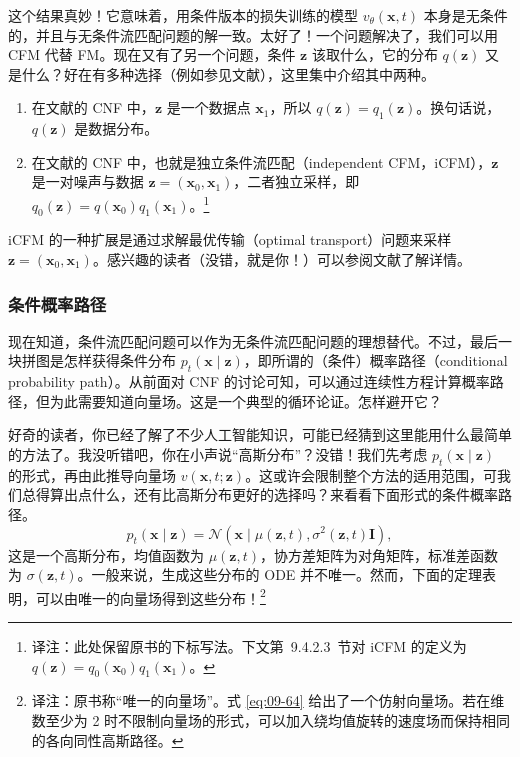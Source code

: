 这个结果真妙！它意味着，用条件版本的损失训练的模型 $v_\theta(\mathbf x,t)$ 本身是无条件的，并且与无条件流匹配问题的解一致。太好了！一个问题解决了，我们可以用 CFM 代替 FM。现在又有了另一个问题，条件 $\mathbf z$ 该取什么，它的分布 $q(\mathbf z)$ 又是什么？好在有多种选择（例如参见文献），这里集中介绍其中两种。
\begin{enumerate}
  \item 在文献的 CNF 中，$\mathbf z$ 是一个数据点 $\mathbf x_1$，所以 $q(\mathbf z)=q_1(\mathbf z)$。换句话说，$q(\mathbf z)$ 是数据分布。
  \item 在文献的 CNF 中，也就是独立条件流匹配（independent CFM，iCFM），$\mathbf z$ 是一对噪声与数据 $\mathbf z=(\mathbf x_0,\mathbf x_1)$，二者独立采样，即 $q_0(\mathbf z)=q(\mathbf x_0)q_1(\mathbf x_1)$。\footnote{译注：此处保留原书的下标写法。下文第~9.4.2.3~节对 iCFM 的定义为 $q(\mathbf z)=q_0(\mathbf x_0)q_1(\mathbf x_1)$。}
\end{enumerate}
iCFM 的一种扩展是通过求解最优传输（optimal transport）问题来采样 $\mathbf z=(\mathbf x_0,\mathbf x_1)$。感兴趣的读者（没错，就是你！）可以参阅文献了解详情。

\subsubsection{条件概率路径}

现在知道，条件流匹配问题可以作为无条件流匹配问题的理想替代。不过，最后一块拼图是怎样获得条件分布 $p_t(\mathbf x\mid\mathbf z)$，即所谓的（条件）概率路径（conditional probability path）。从前面对 CNF 的讨论可知，可以通过连续性方程计算概率路径，但为此需要知道向量场。这是一个典型的循环论证。怎样避开它？

好奇的读者，你已经了解了不少人工智能知识，可能已经猜到这里能用什么最简单的方法了。我没听错吧，你在小声说“高斯分布”？没错！我们先考虑 $p_t(\mathbf x\mid\mathbf z)$ 的形式，再由此推导向量场 $v(\mathbf x,t;\mathbf z)$。这或许会限制整个方法的适用范围，可我们总得算出点什么，还有比高斯分布更好的选择吗？来看看下面形式的条件概率路径。
\begin{equation}
  p_t(\mathbf x\mid\mathbf z)=
  \mathcal N(\mathbf x\mid\mu(\mathbf z,t),\sigma^2(\mathbf z,t)\mathbf I),
  \tag{9.63}\label{eq:09-63}
\end{equation}
这是一个高斯分布，均值函数为 $\mu(\mathbf z,t)$，协方差矩阵为对角矩阵，标准差函数为 $\sigma(\mathbf z,t)$。一般来说，生成这些分布的 ODE 并不唯一。然而，下面的定理表明，可以由唯一的向量场得到这些分布！\footnote{译注：原书称“唯一的向量场”。式 \eqref{eq:09-64} 给出了一个仿射向量场。若在维数至少为 2 时不限制向量场的形式，可以加入绕均值旋转的速度场而保持相同的各向同性高斯路径。}

